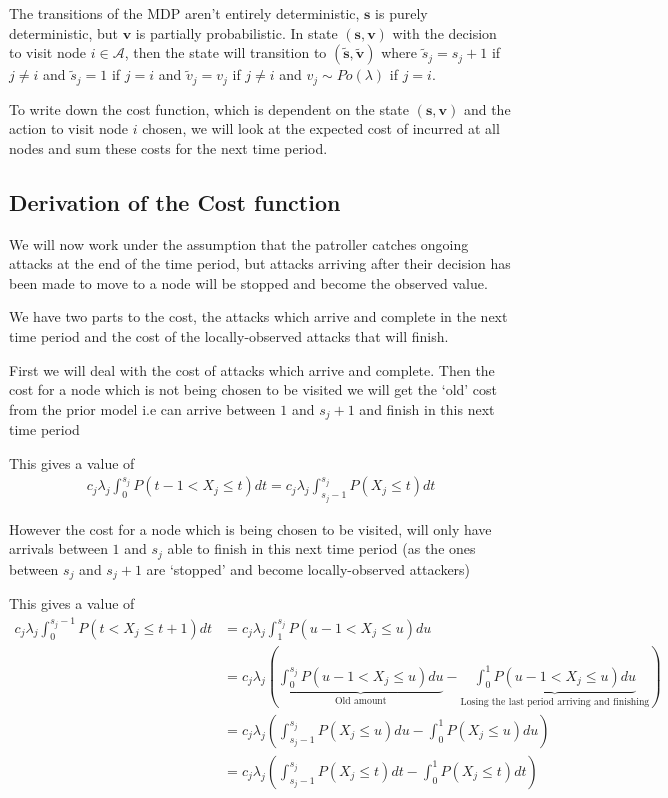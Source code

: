 \documentclass[a4paper,10pt]{article}
\theoremstyle{definition}
\theoremstyle{definition}
\theoremstyle{remark}
\theoremstyle{definition}
\begin{document}
The transitions of the MDP aren't entirely deterministic, $\bm{s}$ is purely deterministic, but $\bm{v}$ is partially probabilistic. In state $(\bm{s},\bm{v})$ with the decision to visit node $i \in \mathcal{A}$, then the state will transition to $(\widetilde{\bm{s}},\widetilde{\bm{v}})$ where $\widetilde{s}_{j}=s_{j}+1$ if $j \neq i$ and $\widetilde{s}_{j}=1$ if $j=i$ and $\widetilde{v}_{j}=v_{j}$ if $j \neq i$ and $v_{j} \sim Po(\lambda)$ if $j=i$.

To write down the cost function, which is dependent on the state $(\bm{s},\bm{v})$ and the action to visit node $i$ chosen, we will look at the expected cost of incurred at all nodes and sum these costs for the next time period.

\subsection{Derivation of the Cost function}
We will now work under the assumption that the patroller catches ongoing attacks at the end of the time period, but attacks arriving after their decision has been made to move to a node will be stopped and become the observed value.

We have two parts to the cost, the attacks which arrive and complete in the next time period and the cost of the locally-observed attacks that will finish.

First we will deal with the cost of attacks which arrive and complete. Then 
the cost for a node which is not being chosen to be visited we will get the `old' cost from the prior model i.e can arrive between $1$ and $s_{j}+1$ and finish in this next time period

This gives a value of
\begin{align*}
c_{j} \lambda_{j} \int_{0}^{s_{j}} P(t-1 < X_{j} \leq t) dt
=c_{j} \lambda_{j} \int_{s_{j}-1}^{s_{j}} P(X_{j} \leq t) dt
\end{align*}

However the cost for a node which is being chosen to be visited, will only have arrivals between $1$ and $s_{j}$ able to finish in this next time period (as the ones between $s_{j}$ and $s_{j}+1$ are `stopped' and become locally-observed attackers)

This gives a value of
\begin{align*}
c_{j} \lambda_{j} \int_{0}^{s_{j}-1} P(t < X_{j} \leq t+1) dt
&=c_{j} \lambda_{j} \int_{1}^{s_{j}} P(u-1 < X_{j} \leq u) du \\
&=c_{j} \lambda_{j} (\underbrace{\int_{0}^{s_{j}} P(u-1 < X_{j} \leq u) du}_{\text{Old amount}} - \underbrace{\int_{0}^{1} P(u-1 < X_{j} \leq u) du}_{\text{Losing the last period arriving and finishing}}) \\
&=c_{j} \lambda_{j} (\int_{s_{j}-1}^{s_{j}} P(X_{j} \leq u) du - \int_{0}^{1} P(X_{j} \leq u) du) \\
&=c_{j} \lambda_{j} (\int_{s_{j}-1}^{s_{j}} P(X_{j} \leq t) dt - \int_{0}^{1} P(X_{j} \leq t) dt)
\end{align*}
\end{document}
